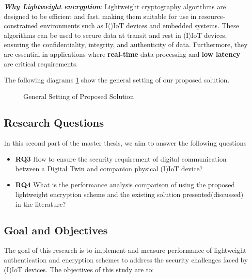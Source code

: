 \textbf{\textit{Why Lightweight encryption}}:
Lightweight cryptography algorithms are designed to be efficient and fast, making them suitable for use in resource-constrained environments such as I()IoT devices and embedded systems.
These algorithms can be used to secure data at transit and rest in (I)IoT devices, ensuring the confidentiality, integrity, and authenticity of data. Furthermore, they are essential in applications where \textbf{real-time} data processing and \textbf{low latency} are critical requirements.

The following diagrams \ref{fig:ps-archi} show the general setting of our proposed solution. 

\begin{figure}[H]
    \caption{General Setting of Proposed Solution}
    \centering
    
    \label{fig:ps-archi}
\end{figure}


\subsection{Research Questions}
In this second part of the master thesis, we aim to answer the following questions 
\begin{itemize}
    \item \textbf{RQ3} How to ensure the security requirement of digital communication between a Digital Twin and companion physical (I)IoT device?
    \item \textbf{RQ4} What is the performance analysis comparison of using the proposed lightweight encryption scheme and the existing solution presented(discussed) in the literature?
\end{itemize}


\subsection{Goal and Objectives}
The goal of this research is to implement and measure performance of lightweight authentication and encryption schemes to address the security challenges faced by (I)IoT devices. The objectives of this study are to:

